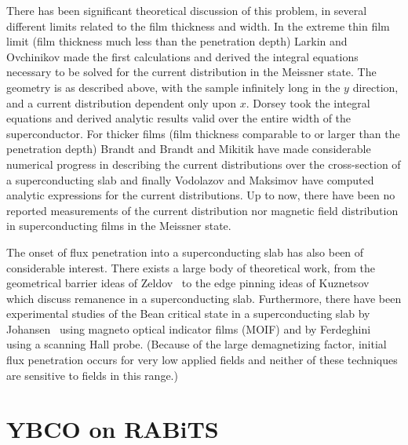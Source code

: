 \afterpage{\clearpage}

There has been significant theoretical 
discussion of this problem, in several different limits related
to the film thickness and width. 
In the extreme thin film limit (film 
thickness much less than the penetration depth) Larkin and Ovchinikov
\cite{larkin_jetp_34_651_1972} made the first calculations 
and derived the integral equations necessary to be solved for 
the current distribution in the Meissner state. 
The geometry is as described above, with the sample infinitely
long in the $y$ direction, and a current distribution 
dependent only upon $x$. 
Dorsey \cite{dorsey_prb_51_15329_1995}  took the
integral equations and derived analytic results valid over the 
entire width of the 
superconductor. For thicker films (film thickness comparable
to or larger than the penetration depth) Brandt
\cite{brandt_prl_71_2821_1993,brandt_prb_49_9024_1994,brandt_prb_54_4246_1996}
and Brandt and Mikitik \cite{brandt_prl_85_4164_2000} have made 
considerable numerical progress in describing the current distributions
over the cross-section of a superconducting slab and finally
Vodolazov and Maksimov \cite{vodolazov_physc_349_125_2001} have computed
analytic expressions for the current distributions. Up to now,
there have been no reported measurements of the current distribution
nor magnetic field distribution
in superconducting films
in the Meissner state.

The onset of flux penetration into a superconducting slab has also
been of considerable interest. There exists a large body
of theoretical work, from the geometrical barrier ideas of 
Zeldov \etal\,\cite{zeldov_prl_73_1428_1994} to the edge 
pinning ideas of Kuznetsov \etal\,\cite{kuznetsov_prb_59_1507_1999}
which discuss remanence in a superconducting slab. 
Furthermore, there have been experimental studies of the Bean
critical state in a superconducting slab by Johansen \etal\,
\cite{johansen_prb_54_16264_1996} using magneto optical indicator
films (MOIF) and by Ferdeghini \etal\,\cite{ferdeghini_physc_294_233_1998} 
using a scanning Hall probe. (Because of the large demagnetizing 
factor, initial flux penetration occurs for very low applied fields
and neither of
these techniques are sensitive to fields in this range.)

%
%

\section{YBCO on RABiTS}

